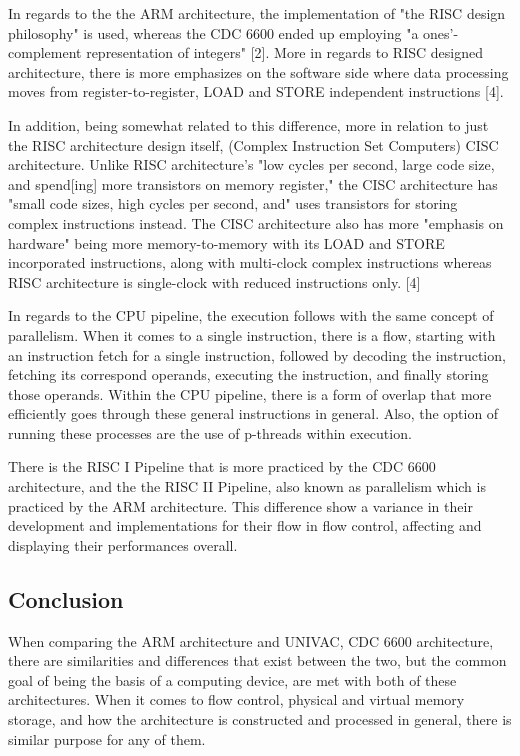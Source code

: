 \documentclass[letterpaper,10pt,onecolumn,compsoc]{IEEEtran}
\begin{document}
\noindent
In regards to the the ARM architecture, the implementation of "the RISC design philosophy" is used, whereas the CDC 6600 ended up employing "a ones'-complement representation of integers" [2]. More in regards to RISC designed architecture, there is more emphasizes on the software side where data processing moves from register-to-register, LOAD and STORE independent instructions [4]. 

\newpage

\noindent
In addition, being somewhat related to this difference, more in relation to just the RISC architecture design itself, (Complex Instruction Set Computers) CISC architecture. Unlike RISC architecture's "low cycles per second, large code size, and spend[ing] more transistors on memory register," the CISC architecture has "small code sizes, high cycles per second, and" uses transistors for storing complex instructions instead. The CISC architecture also has more "emphasis on hardware" being more memory-to-memory with its LOAD and STORE incorporated instructions, along with multi-clock complex instructions whereas RISC architecture is single-clock with reduced instructions only. [4]

\noindent
In regards to the CPU pipeline, the execution follows with the same concept of parallelism. When it comes to a single instruction, there is a flow, starting with an instruction fetch for a single instruction, followed by decoding the instruction, fetching its correspond operands, executing the instruction, and finally storing those operands. Within the CPU pipeline, there is a form of overlap that more efficiently goes through these general instructions in general. Also, the option of running these processes are the use of p-threads within execution.

\noindent
There is the RISC I Pipeline that is more practiced by the CDC 6600 architecture, and the the RISC II Pipeline, also known as parallelism which is practiced by the ARM architecture. This difference show a variance in their development and implementations for their flow in flow control, affecting and displaying their performances overall.

\subsection{Conclusion}

\noindent
When comparing the ARM architecture and UNIVAC, CDC  6600 architecture, there are similarities and differences that exist between the two, but the common goal of being the basis of a computing device, are met with both of these architectures. When it comes to flow control, physical and virtual memory storage, and how the architecture is constructed and processed in general, there is similar purpose for any of them.
\end{document}
